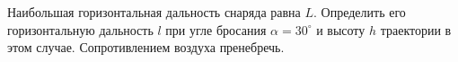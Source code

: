 Наибольшая горизонтальная дальность снаряда равна $L$.
Определить его горизонтальную дальность $l$ при угле бросания
$\alpha=30^\circ$ и высоту $h$ траектории в этом случае.
Сопротивлением воздуха пренебречь.

